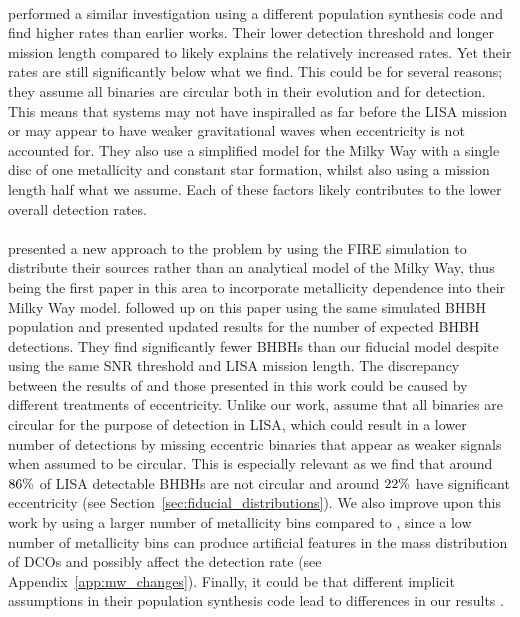 \paragraph{\citet{Liu+2014}} performed a similar investigation using a different population synthesis code and find higher rates than earlier works. Their lower detection threshold and longer mission length compared to \citet{Belczynski+2010} likely explains the relatively increased rates. Yet their rates are still significantly below what we find. This could be for several reasons; they assume all binaries are circular both in their evolution and for detection. This means that systems may not have inspiralled as far before the LISA mission or may appear to have weaker gravitational waves when eccentricity is not accounted for. They also use a simplified model for the Milky Way with a single disc of one metallicity and constant star formation, whilst also using a mission length half what we assume. Each of these factors likely contributes to the lower overall detection rates.

\paragraph{\citet{Lamberts+2018}} presented a new approach to the problem by using the FIRE simulation \citep{Hopkins+2014} to distribute their sources rather than an analytical model of the Milky Way, thus being the first paper in this area to incorporate metallicity dependence into their Milky Way model. \citet{Sesana+2020} followed up on this paper using the same simulated BHBH population and presented updated results for the number of expected BHBH detections. They find significantly fewer BHBHs than our fiducial model despite using the same SNR threshold and LISA mission length.
%
The discrepancy between the results of \citet{Sesana+2020} and those presented in this work could be caused by different treatments of eccentricity. Unlike our work, \citet{Sesana+2020} assume that all binaries are circular for the purpose of detection in LISA, which could result in a lower number of detections by missing eccentric binaries that appear as weaker signals when assumed to be circular. This is especially relevant as we find that around $86\%{}$ of LISA detectable BHBHs are not circular and around $22\%{}$ have significant eccentricity (see Section~\ref{sec:fiducial_distributions}). We also improve upon this work by using a larger number of metallicity bins compared to \citet{Sesana+2020}, since a low number of metallicity bins can produce artificial features in the mass distribution of DCOs and possibly affect the detection rate (see Appendix~\ref{app:mw_changes}). Finally, it could be that different implicit assumptions in their population synthesis code lead to differences in our results \citep{Toonen+2014}.

